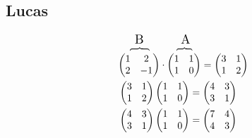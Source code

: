 \documentclass[12pt]{article}
\theoremstyle{definition}
\begin{document}
\subsection*{Lucas}
\[
\begin{aligned}
&\overset{\scalebox{1.3}{\ \ B}}{
  \overset{\scalebox{2}[1]{\ \rotatebox{90}{\}}}}{
    \begin{pmatrix}
      1 & 2\\
      2 & -1
    \end{pmatrix}
  }
}
\cdot
\overset{\scalebox{1.3}{\ \ A}}{
  \overset{\scalebox{1.6}[1]{\ \rotatebox{90}{\}}}}{
    \begin{pmatrix}
      1 & 1\\
      1 & 0
    \end{pmatrix}
  }
}
=
\begin{pmatrix}
  3 & 1\\
  1 & 2
\end{pmatrix}\\
&\begin{pmatrix}
  3 & 1\\
  1 & 2
\end{pmatrix}
\begin{pmatrix}
  1 & 1\\
  1 & 0
\end{pmatrix}
=
\begin{pmatrix}
  4 & 3\\
  3 & 1
\end{pmatrix}\\
&\begin{pmatrix}
  4 & 3\\
  3 & 1
\end{pmatrix}
\begin{pmatrix}
  1 & 1\\
  1 & 0
\end{pmatrix}
=
\begin{pmatrix}
  7 & 4\\
  4 & 3
\end{pmatrix}
\end{aligned}
\]
\end{document}
